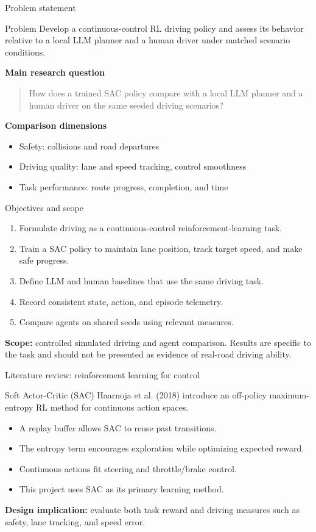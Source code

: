 \documentclass[aspectratio=169,10pt]{beamer}
\begin{document}
\begin{frame}{Problem statement}
\begin{block}{Problem}
Develop a continuous-control RL driving policy and assess its behavior relative to a local LLM planner and a human driver under matched scenario conditions.
\end{block}
\textbf{Main research question}
\begin{quote}
How does a trained SAC policy compare with a local LLM planner and a human driver on the same seeded driving scenarios?
\end{quote}
\textbf{Comparison dimensions}
\begin{itemize}
  \item Safety: collisions and road departures
  \item Driving quality: lane and speed tracking, control smoothness
  \item Task performance: route progress, completion, and time
\end{itemize}
\end{frame}

\begin{frame}{Objectives and scope}
\begin{enumerate}
  \item Formulate driving as a continuous-control reinforcement-learning task.
  \item Train a SAC policy to maintain lane position, track target speed, and make safe progress.
  \item Define LLM and human baselines that use the same driving task.
  \item Record consistent state, action, and episode telemetry.
  \item Compare agents on shared seeds using relevant measures.
\end{enumerate}
\vspace{0.5em}
\textbf{Scope:} controlled simulated driving and agent comparison. Results are specific to the task and should not be presented as evidence of real-road driving ability.
\end{frame}

\begin{frame}{Literature review: reinforcement learning for control}
\begin{block}{Soft Actor-Critic (SAC)}
Haarnoja et al. (2018) introduce an off-policy maximum-entropy RL method for continuous action spaces.
\end{block}
\begin{itemize}
  \item A replay buffer allows SAC to reuse past transitions.
  \item The entropy term encourages exploration while optimizing expected reward.
  \item Continuous actions fit steering and throttle/brake control.
  \item This project uses SAC as its primary learning method.
\end{itemize}
\vspace{0.4em}
\textbf{Design implication:} evaluate both task reward and driving measures such as safety, lane tracking, and speed error.
\end{frame}
\end{document}
